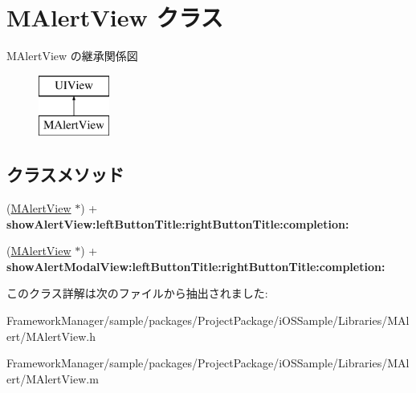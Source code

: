 \hypertarget{interface_m_alert_view}{}\section{M\+Alert\+View クラス}
\label{interface_m_alert_view}
M\+Alert\+View の継承関係図\begin{figure}[H]
\begin{center}
\leavevmode
\includegraphics[height=2.000000cm]{interface_m_alert_view}
\end{center}
\end{figure}
\subsection*{クラスメソッド}
\begin{DoxyCompactItemize}
\item 
\hypertarget{interface_m_alert_view_a13fc8cf332f3641baf69cdd56ef1a3e2}{}(\hyperlink{interface_m_alert_view}{M\+Alert\+View} $\ast$) + {\bfseries show\+Alert\+View\+:left\+Button\+Title\+:right\+Button\+Title\+:completion\+:}\label{interface_m_alert_view_a13fc8cf332f3641baf69cdd56ef1a3e2}

\item 
\hypertarget{interface_m_alert_view_a41deb7f5126b11452f5ffdffc15931c9}{}(\hyperlink{interface_m_alert_view}{M\+Alert\+View} $\ast$) + {\bfseries show\+Alert\+Modal\+View\+:left\+Button\+Title\+:right\+Button\+Title\+:completion\+:}\label{interface_m_alert_view_a41deb7f5126b11452f5ffdffc15931c9}

\end{DoxyCompactItemize}


このクラス詳解は次のファイルから抽出されました\+:\begin{DoxyCompactItemize}
\item 
Framework\+Manager/sample/packages/\+Project\+Package/i\+O\+S\+Sample/\+Libraries/\+M\+Alert/M\+Alert\+View.\+h\item 
Framework\+Manager/sample/packages/\+Project\+Package/i\+O\+S\+Sample/\+Libraries/\+M\+Alert/M\+Alert\+View.\+m\end{DoxyCompactItemize}
